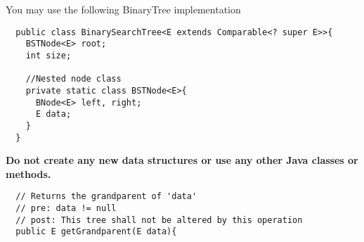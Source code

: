 \documentclass[12pt,letter]{article}
\begin{document}
\vspace{4pt}
\noindent You may use the following BinaryTree implementation

\begin{verbatim}
  public class BinarySearchTree<E extends Comparable<? super E>>{
    BSTNode<E> root;
    int size;

    //Nested node class
    private static class BSTNode<E>{
      BNode<E> left, right;
      E data;
    }
  }
\end{verbatim}

\noindent \textbf{Do not create any new data structures or use any other Java classes or methods.}

\clearpage
\begin{verbatim}
  // Returns the grandparent of 'data'
  // pre: data != null
  // post: This tree shall not be altered by this operation
  public E getGrandparent(E data){
\end{verbatim}
\end{document}
